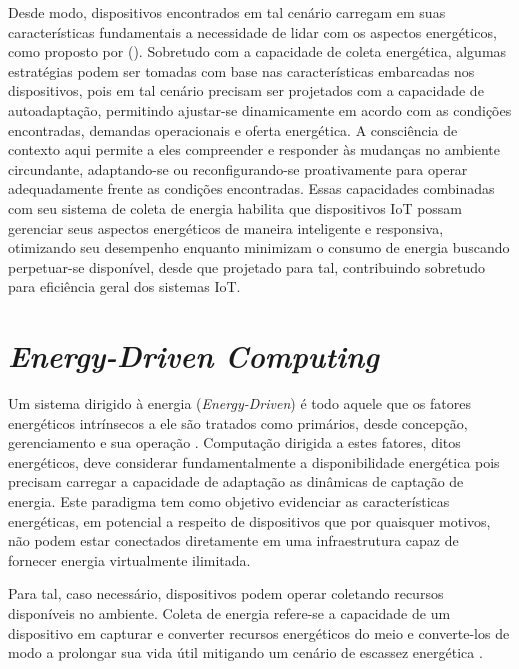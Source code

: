 Desde modo, dispositivos encontrados em tal cenário carregam em suas características fundamentais a necessidade de lidar com os aspectos energéticos, como proposto por \citeauthor{kansal_power_2007} (\citeyear{kansal_power_2007}). Sobretudo com a capacidade de coleta energética, algumas estratégias podem ser tomadas com base nas características embarcadas nos dispositivos, pois em tal cenário precisam ser projetados com a capacidade de autoadaptação, permitindo ajustar-se dinamicamente em acordo com as condições encontradas, demandas operacionais e oferta energética. A consciência de contexto aqui permite a eles compreender e responder às mudanças no ambiente circundante, adaptando-se ou reconfigurando-se proativamente para operar adequadamente frente as condições encontradas. Essas capacidades combinadas com seu sistema de coleta de energia habilita que dispositivos IoT possam gerenciar seus aspectos energéticos de maneira inteligente e responsiva, otimizando seu desempenho enquanto minimizam o consumo de energia buscando perpetuar-se disponível, desde que projetado para tal, contribuindo sobretudo para eficiência geral dos sistemas IoT.





\section{\textit{Energy-Driven Computing}}
\label{cap2:energyDriven}

Um sistema dirigido à energia (\textit{Energy-Driven}) é todo aquele que os fatores energéticos intrínsecos a ele são tratados como primários, desde concepção, gerenciamento e sua operação \cite{merrett_energy-driven_2017}. Computação dirigida a estes fatores, ditos energéticos, deve considerar fundamentalmente a disponibilidade energética pois precisam carregar a capacidade de adaptação as dinâmicas de captação de energia. Este paradigma tem como objetivo evidenciar as características energéticas, em potencial a respeito de dispositivos que por quaisquer motivos, não podem estar conectados diretamente em uma infraestrutura capaz de fornecer energia virtualmente ilimitada. 

Para tal, caso necessário, dispositivos podem operar coletando recursos disponíveis no ambiente. Coleta de energia refere-se a capacidade de um dispositivo em capturar e converter recursos energéticos do meio e converte-los de modo a prolongar sua vida útil mitigando um cenário de escassez energética \cite{sudevalayam_energy_2011}. 

